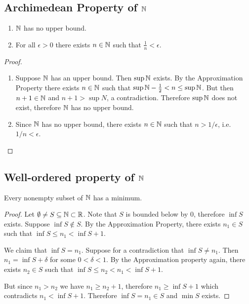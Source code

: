 \subsection{Archimedean Property of $\mathbb{N}$}
\begin{theorem*}\hspace{0pt}
  \begin{enumerate}
  \item $\mathbb{N}$ has no upper bound.
  \item For all $\epsilon > 0$ there exists $n \in \mathbb{N}$ such that $\frac{1}{n} < \epsilon$.
  \end{enumerate}
\end{theorem*}
\begin{proof}\hspace{0pt}
  \begin{enumerate}
  \item Suppose $\mathbb{N}$ has an upper bound. Then $\sup \mathbb{N}$ exists. By the Approximation Property
    there exists $n \in \mathbb{N}$ such that $\sup \mathbb{N} - \frac{1}{2} < n \leq \sup \mathbb{N}$. But then
    $n + 1 \in \mathbb{N}$ and $n + 1 > \sup N$, a contradiction. Therefore $\sup \mathbb{N}$ does not exist,
    therefore $\mathbb{N}$ has no upper bound.
  \item Since $\mathbb{N}$ has no upper bound, there exists $n \in \mathbb{N}$ such that $n > 1/\epsilon$,
    i.e. $1/n < \epsilon$.
  \end{enumerate}
\end{proof}

\subsection{Well-ordered property of $\mathbb{N}$}
\begin{theorem*}\hspace{0pt}
  Every nonempty subset of $\mathbb{N}$ has a minimum.
\end{theorem*}

\begin{proof}
  Let $\emptyset \neq S \subseteq \mathbb{N} \subset \mathbb{R}$. Note that $S$ is bounded below by 0, therefore
  $\inf S$ exists. Suppose $\inf S \not\in S$. By the Approximation Property, there exists
  $n_1 \in S$ such that $\inf S \leq n_1 < \inf S + 1$.

  We claim that $\inf S = n_1$. Suppose for a contradiction that $\inf S \neq n_1$. Then
  $n_1 = \inf S + \delta$ for some $0 < \delta < 1$. By the Approximation property again, there
  exists $n_2 \in S$ such that $\inf S \leq n_2 < n_1 < \inf S + 1$.

  But since $n_1 > n_2$ we have $n_1 \geq n_2 + 1$, therefore $n_1 \geq \inf S + 1$ which
  contradicts $n_1 < \inf S + 1$. Therefore $\inf S = n_1 \in S$ and $\min S$ exists.
\end{proof}

